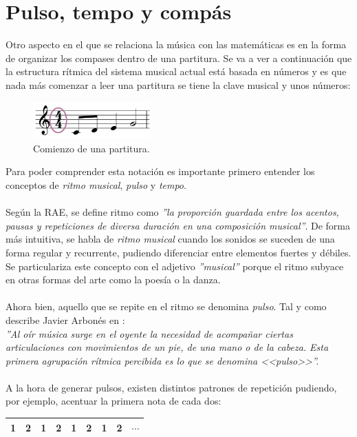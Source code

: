\documentclass[a4paper, openright, 11pt, titlepage]{report}
\theoremstyle{definition}\newtheorem{defin}[propo]{Definition}
\theoremstyle{definition}\newtheorem{obser}[propo]{Remark}
\theoremstyle{definition}\newtheorem{ejem}[propo]{Ejemplo}
\theoremstyle{definition}\newtheorem{algoritmo}[propo]{Algoritmo}
\begin{document}
\chapter{Pulso, tempo y compás}
Otro aspecto en el que se relaciona la música con las matemáticas es en la forma de organizar los compases dentro de una partitura. Se va a ver a continuación que la estructura rítmica del sistema musical actual está basada en números y es que nada más comenzar a leer una partitura se tiene la clave musical y unos números:
\begin{figure}[H]
    \centering
    \includegraphics[width = 0.4\textwidth]{compas.png}
    \caption{Comienzo de una partitura.}
\end{figure}
Para poder comprender esta notación es importante primero entender los conceptos de \textit{ritmo musical}, \textit{pulso} y \textit{tempo}.\\\\
Según la RAE, se define ritmo como \textit{''la proporción guardada entre los acentos, pausas y repeticiones de diversa duración en una composición musical''}. De forma más intuitiva, se habla de \textit{ritmo musical} cuando los sonidos se suceden de una forma regular y recurrente, pudiendo diferenciar entre elementos fuertes y débiles.\\
Se particulariza este concepto con el adjetivo \textit{''musical''} porque el ritmo subyace en otras formas del arte como la poesía o la danza.\\\\
Ahora bien, aquello que se repite en el ritmo se denomina \textit{pulso}. Tal y como describe Javier Arbonés en \cite{libro}:\\
\textit{''Al oír música surge en el oyente la necesidad de acompañar ciertas articulaciones con movimientos de un pie, de una mano o de la cabeza. Esta primera agrupación rítmica percibida es lo que se denomina <<pulso>>''.}\\\\
A la hora de generar pulsos, existen distintos patrones de repetición pudiendo, por ejemplo, acentuar la primera nota de cada dos:
\begin{table}[H]
    \centering
    \begin{tabular}{|c|c|c|c|c|c|c|c|c|}
    \hline
        \cellcolor{acento}1 & 2 & \cellcolor{acento}1 & 2 & \cellcolor{acento}1 & 2 & \cellcolor{acento}1 & 2 & $\cdots$ \\
    \hline
    \end{tabular}
\end{table}
\end{document}
